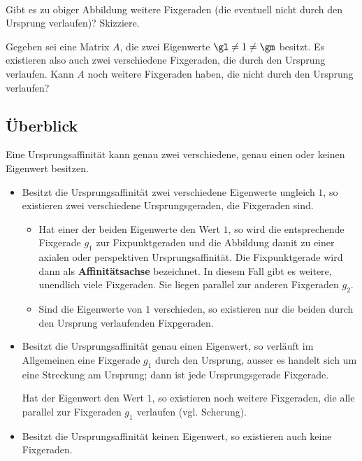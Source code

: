 \documentclass[%
11pt,%
twoside,%
titlepage,%
german,%
headsepline%
]{scrartcl}
\begin{document}
\begin{description}
\end{description}

\begin{ueb}
\ \\[-4ex]
\begin{enumeratea}
\item Gibt es zu obiger Abbildung weitere Fixgeraden (die eventuell nicht durch den Ursprung verlaufen)? Skizziere.
\item Gegeben sei eine Matrix $A$, die zwei Eigenwerte $\gl\neq1\neq\gm$ besitzt. Es existieren also auch zwei verschiedene Fixgeraden, die durch den Ursprung verlaufen. Kann $A$ noch weitere Fixgeraden haben, die nicht durch den Ursprung verlaufen?
\end{enumeratea}
\end{ueb}

\subsection{Überblick}
Eine Ursprungsaffinität kann genau zwei verschiedene, genau einen oder keinen Eigenwert besitzen.
\begin{itemize}
\item Besitzt die Ursprungsaffinität zwei verschiedene Eigenwerte ungleich $1$, so existieren zwei verschiedene Ursprungsgeraden, die Fixgeraden sind.
\begin{itemize}
\item Hat einer der beiden Eigenwerte den Wert $1$, so wird die entsprechende Fixgerade $g_1$ zur Fixpunktgeraden und die Abbildung damit zu einer axialen oder perspektiven Ursprungsaffinität. Die Fixpunktgerade wird dann als \textbf{Affinitätsachse} bezeichnet. In diesem Fall gibt es weitere, unendlich viele Fixgeraden. Sie liegen parallel zur anderen Fixgeraden $g_2$.
\item Sind die Eigenwerte von $1$ verschieden, so existieren nur die beiden durch den Ursprung verlaufenden Fixpgeraden.
\end{itemize}
\item Besitzt die Ursprungsaffinität genau einen Eigenwert, so verläuft im Allgemeinen eine Fixgerade $g_1$ durch den Ursprung, ausser es handelt sich um eine Streckung am Ursprung; dann ist jede Ursprungsgerade Fixgerade.

Hat der Eigenwert den Wert $1$, so existieren noch weitere Fixgeraden, die alle parallel zur Fixgeraden $g_1$ verlaufen (vgl. Scherung).
\item Besitzt die Ursprungsaffinität keinen Eigenwert, so existieren auch keine Fixgeraden.
\end{itemize}
\end{document}
